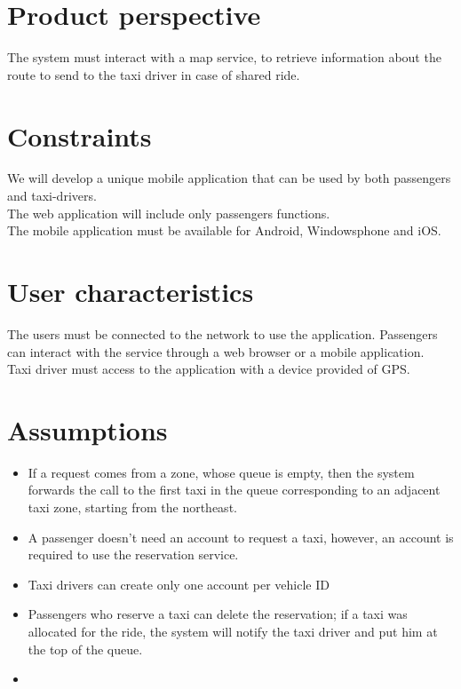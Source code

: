 \section{Product perspective}
The system must interact with a map service, to retrieve information about the route to send to the taxi driver in case of shared ride.


\section{Constraints}
We will develop a unique mobile application that can be used by both passengers and taxi-drivers.\\
The web application will include only passengers functions.\\
The mobile application must be available for Android, Windowsphone and iOS.\\


\section{User characteristics}
The users must be connected to the network to use the application.
Passengers can interact with the service through a web browser or a mobile application.\\
Taxi driver must access to the application with a device provided of GPS.


\section{Assumptions}
\begin{itemize}
  \item If a request comes from a zone, whose queue is empty, then the system forwards the call to the first taxi in the queue corresponding to an adjacent taxi zone, starting from the northeast.
  \item A passenger doesn't need an account to request a taxi, however, an account is required to use the reservation service. %
  \item Taxi drivers can create only one account per vehicle ID %
  \item Passengers who reserve a taxi can delete the reservation; if a taxi was allocated for the ride, the system will notify the taxi driver and put him at the top of the queue.
  \item
\end{itemize} 

